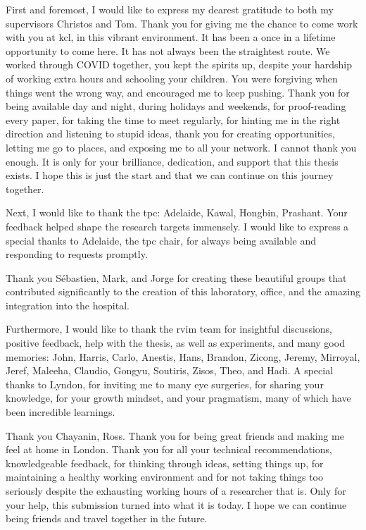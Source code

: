 First and foremost, I would like to express my dearest gratitude to both my supervisors Christos and Tom. Thank you for giving me the chance to come work with you at \gls{kcl}, in this vibrant environment. It has been a once in a lifetime opportunity to come here. It has not always been the straightest route. We worked through COVID together, you kept the spirits up, despite your hardship of working extra hours and schooling your children. You were forgiving when things went the wrong way, and encouraged me to keep pushing. Thank you for being available day and night, during holidays and weekends, for proof-reading every paper, for taking the time to meet regularly, for hinting me in the right direction and listening to stupid ideas, thank you for creating opportunities, letting me go to places, and exposing me to all your network. I cannot thank you enough. It is only for your brilliance, dedication, and support that this thesis exists. I hope this is just the start and that we can continue on this journey together.

Next, I would like to thank the \gls{tpc}: Adelaide, Kawal, Hongbin, Prashant.  Your feedback helped shape the research targets immensely. I would like to express a special thanks to Adelaide, the \gls{tpc} chair, for always being available and responding to requests promptly.

Thank you S\'{e}bastien, Mark, and Jorge for creating these beautiful groups that contributed significantly to the creation of this laboratory, office, and the amazing integration into the hospital.

Furthermore, I would like to thank the \gls{rvim} team for insightful discussions, positive feedback, help with the thesis, as well as experiments, and many good memories: John, Harris, Carlo, Anestis, Hans, Brandon, Zicong, Jeremy, Mirroyal, Jeref, Maleeha, Claudio, Gongyu, Soutiris, Zisos, Theo, and Hadi. A special thanks to Lyndon, for inviting me to many eye surgeries, for sharing your knowledge, for your growth mindset, and your pragmatism, many of which have been incredible learnings.

Thank you Chayanin, Ross. Thank you for being great friends and making me feel at home in London. Thank you for all your technical recommendations, knowledgeable feedback, for thinking through ideas, setting things up, for maintaining a healthy working environment and for not taking things too seriously despite the exhausting working hours of a researcher that is. Only for your help, this submission turned into what it is today. I hope we can continue being friends and travel together in the future.

